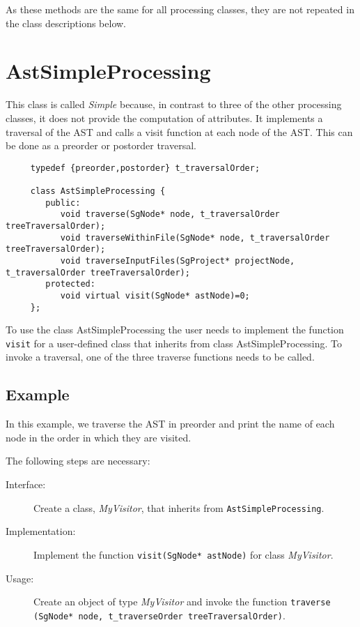 As these methods are the same for all processing classes, they are not
repeated in the class descriptions below.

\section{AstSimpleProcessing}
\label{AstProcessing:AstSimpleProcessing}

This class is called {\em Simple} because, in contrast to three of the other
processing classes, it does not provide the computation of
attributes. It implements a traversal of the AST and calls a
visit function at each node of the AST. This can be done as
a preorder or postorder traversal.

{\indent
{\footnotesize
\begin{verbatim}
     typedef {preorder,postorder} t_traversalOrder;

     class AstSimpleProcessing {
        public:
           void traverse(SgNode* node, t_traversalOrder treeTraversalOrder);
           void traverseWithinFile(SgNode* node, t_traversalOrder treeTraversalOrder);
           void traverseInputFiles(SgProject* projectNode, t_traversalOrder treeTraversalOrder);
        protected:
           void virtual visit(SgNode* astNode)=0;
     };
\end{verbatim}
}}
To use the class AstSimpleProcessing the user needs to implement the
function {\tt visit} for a user-defined class that inherits
from class AstSimpleProcessing. To invoke a traversal, one of the three
traverse functions needs to be called.

\subsection{Example}

In this example, we traverse the AST in preorder and print the name of
each node in the order in which they are visited.

The following steps are necessary:

\begin{description}
   \item[Interface:] Create a class, {\em MyVisitor}, that inherits from {\tt AstSimpleProcessing}.
   \item[Implementation:] Implement the function {\tt visit(SgNode* astNode)} for class {\em MyVisitor}.
   \item[Usage:] Create an object of type {\em MyVisitor} and invoke the function 
     {\tt traverse (SgNode* node, t\_traverseOrder treeTraversalOrder)}.
\end{description}

